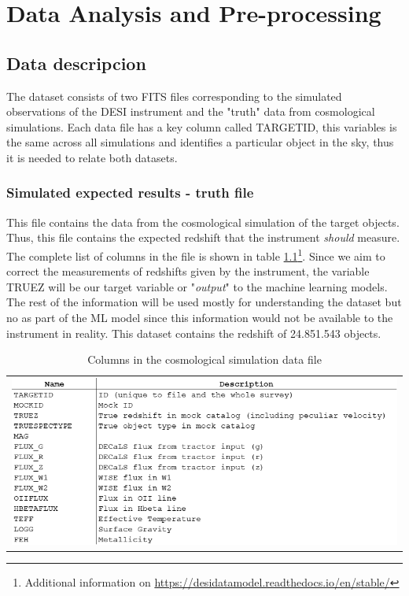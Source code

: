 \chapter{Data Analysis and Pre-processing}
\label{Ch:Data}
\section{Data descripcion}

The dataset consists of two FITS files corresponding to the simulated observations of the DESI instrument and the "truth" data from cosmological simulations. Each data file has a key column called TARGETID, this variables is the same across all simulations and identifies a particular object in the sky, thus it is needed to relate both datasets. 
\subsection{Simulated expected results - truth file}
This file contains the data from the cosmological simulation of the target objects. Thus, this file contains the expected redshift that the instrument \textit{should} measure. The complete list of columns in the file is shown in table \ref{tab:true_car}\footnote{Additional information on \url{https://desidatamodel.readthedocs.io/en/stable/}}. Since we aim to correct the measurements of redshifts given by the instrument, the variable TRUEZ will be our target variable or "\textit{output}" to the machine learning models. The rest of the information will be used mostly for understanding the dataset but no as part of the ML model since this information would not be available to the instrument in reality. This dataset contains the redshift of 24.851.543 objects. 
\begin{table}[!htbp]
	\centering
	\begin{tabular}{c}
		\includegraphics[width=0.9\linewidth]{TeX_files/Imagenes/Imagen2}
	\end{tabular} 
	\caption{Columns in the cosmological simulation data file}
	\label{tab:true_car}
\end{table}
